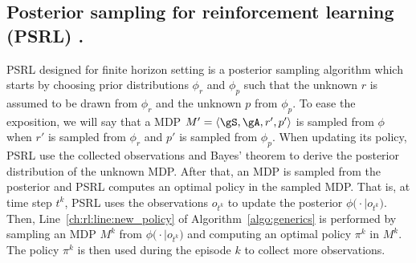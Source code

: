 \subsection{Posterior sampling for reinforcement learning (PSRL) \texorpdfstring{\cite{osband2013more}}{[ORV13]}.}

PSRL designed for finite horizon setting is a posterior sampling algorithm which starts by choosing prior distributions $\phi_r$ and $\phi_p$ such that the unknown $r$ is assumed to be drawn from $\phi_r$ and the unknown $p$ from $\phi_p$.
To ease the exposition, we will say that a MDP $M'=\langle\gS,\gA,r',p'\rangle$ is sampled from $\phi$ when $r'$ is sampled from $\phi_r$ and $p'$ is sampled from $\phi_p$.
When updating its policy, PSRL use the collected observations and Bayes' theorem to derive the posterior distribution of the unknown MDP.
After that, an MDP is sampled from the posterior and PSRL computes an optimal policy in the sampled MDP.
That is, at time step $t^k$, PSRL uses the observations $o_{t^k}$ to update the posterior $\phi\bigl(\cdot\mid o_{t^k}\bigr)$.
Then, Line~\ref{ch:rl:line:new_policy} of Algorithm~\ref{algo:generics} is performed by sampling an MDP $M^k$ from $\phi\bigl(\cdot\mid o_{t^k}\bigr)$ and computing an optimal policy $\pi^k$ in $M^k$.
The policy $\pi^k$ is then used during the episode $k$ to collect more observations.

